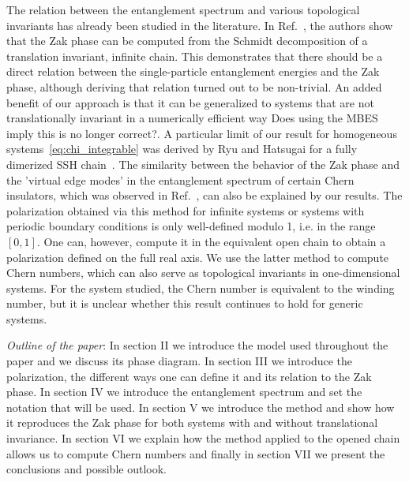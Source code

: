 \documentclass[twocolumn,amsmath,longbibliography,amssymb,superscriptaddress]{revtex4-1}
\newcommand{\carlos}[1]{{\color{red} #1}}
\begin{document}
The relation between the entanglement spectrum and various topological invariants has already been studied in the literature. 
In Ref.~\cite{Zaletel2014}, the authors show that the Zak phase can be computed from the Schmidt decomposition of a translation invariant, infinite chain. 
This demonstrates that there should be a direct relation between the single-particle entanglement energies and the Zak phase, although deriving that relation turned out to be non-trivial. 
An added benefit of our approach is that it can be generalized to systems that are not translationally invariant in a numerically efficient way \carlos{Does using the MBES imply this is no longer correct?}. 
A particular limit of our result for homogeneous systems~\eqref{eq:chi_integrable} was derived by Ryu and Hatsugai for a fully dimerized SSH chain~\cite{Ryu2006}. 
The similarity between the behavior of the Zak phase and the 'virtual edge modes' in the entanglement spectrum of certain Chern insulators, which was observed in Ref.~\cite{Huang2012,Huang2012-2}, can also be explained by our results. 
The polarization obtained via this method for infinite systems or systems with periodic boundary conditions is only well-defined modulo 1, i.e. in the range $[0,1]$. 
One can, however, compute it in the equivalent open chain to obtain a polarization defined on the full real axis. %
We use the latter method to compute Chern numbers, which can also serve as topological invariants in one-dimensional systems.
For the system studied, the Chern number is equivalent to the winding number, but it is unclear whether this result continues to hold for generic systems.

\emph{Outline of the paper}: In section II we introduce the model used throughout the paper and we discuss its phase diagram. In section III we introduce the polarization, the different ways one can define it and its relation to the Zak phase. In section IV we introduce the entanglement spectrum and set the notation that will be used. In section V we introduce the method and show how it reproduces the Zak phase for both systems with and without translational invariance. In section VI we explain how the method applied to the opened chain allows us to compute Chern numbers %
and finally in section VII we present the conclusions and possible outlook.

\end{document}
